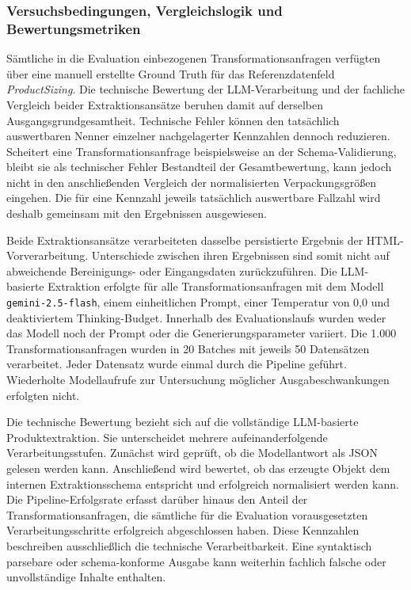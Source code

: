 \subsubsection{Versuchsbedingungen, Vergleichslogik und Bewertungsmetriken}

Sämtliche in die Evaluation einbezogenen Transformationsanfragen verfügten über eine manuell erstellte Ground Truth für das Referenzdatenfeld \textit{ProductSizing}. Die technische Bewertung der LLM-Verarbeitung und der fachliche Vergleich beider Extraktionsansätze beruhen damit auf derselben Ausgangsgrundgesamtheit. Technische Fehler können den tatsächlich auswertbaren Nenner einzelner nachgelagerter Kennzahlen dennoch reduzieren. Scheitert eine Transformationsanfrage beispielsweise an der Schema-Validierung, bleibt sie als technischer Fehler Bestandteil der Gesamtbewertung, kann jedoch nicht in den anschließenden Vergleich der normalisierten Verpackungsgrößen eingehen. Die für eine Kennzahl jeweils tatsächlich auswertbare Fallzahl wird deshalb gemeinsam mit den Ergebnissen ausgewiesen.

Beide Extraktionsansätze verarbeiteten dasselbe persistierte Ergebnis der HTML-Vorverarbeitung. Unterschiede zwischen ihren Ergebnissen sind somit nicht auf abweichende Bereinigungs- oder Eingangsdaten zurückzuführen. Die LLM-basierte Extraktion erfolgte für alle Transformationsanfragen mit dem Modell \texttt{gemini-2.5-flash}, einem einheitlichen Prompt, einer Temperatur von 0,0 und deaktiviertem Thinking-Budget. Innerhalb des Evaluationslaufs wurden weder das Modell noch der Prompt oder die Generierungsparameter variiert. Die 1.000 Transformationsanfragen wurden in 20 Batches mit jeweils 50 Datensätzen verarbeitet. Jeder Datensatz wurde einmal durch die Pipeline geführt. Wiederholte Modellaufrufe zur Untersuchung möglicher Ausgabeschwankungen erfolgten nicht.

Die technische Bewertung bezieht sich auf die vollständige LLM-basierte Produktextraktion. Sie unterscheidet mehrere aufeinanderfolgende Verarbeitungsstufen. Zunächst wird geprüft, ob die Modellantwort als JSON gelesen werden kann. Anschließend wird bewertet, ob das erzeugte Objekt dem internen Extraktionsschema entspricht und erfolgreich normalisiert werden kann. Die Pipeline-Erfolgsrate erfasst darüber hinaus den Anteil der Transformationsanfragen, die sämtliche für die Evaluation vorausgesetzten Verarbeitungsschritte erfolgreich abgeschlossen haben. Diese Kennzahlen beschreiben ausschließlich die technische Verarbeitbarkeit. Eine syntaktisch parsebare oder schema-konforme Ausgabe kann weiterhin fachlich falsche oder unvollständige Inhalte enthalten.

